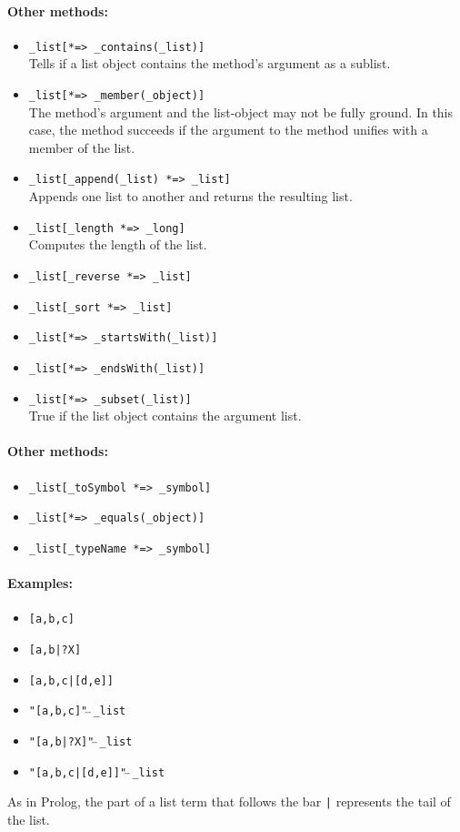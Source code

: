 \documentclass[11pt]{article}
\begin{document}
\paragraph{Other methods:}
\begin{itemize}
\item {\tt \_list[*=> \_contains(\_list)]} 
  \\
  Tells if a list object contains the method's argument as a sublist.
\item {\tt \_list[*=> \_member(\_object)]}  
  \\
  The method's argument and the list-object may not be fully ground. In this
  case, the method succeeds if the argument to the method unifies with a
  member of the list.
\item {\tt \_list[\_append(\_list) *=> \_list]}  \\
  Appends one list to another and returns the resulting list.
\item {\tt \_list[\_length *=> \_long]}  
  \\
  Computes the length of the list.
\item {\tt \_list[\_reverse *=> \_list]}  
\item {\tt \_list[\_sort *=> \_list]}  
\item {\tt \_list[*=> \_startsWith(\_list)]}  
\item {\tt \_list[*=> \_endsWith(\_list)]}  
\item {\tt \_list[*=> \_subset(\_list)]}  
  \\
  True if the list object contains the argument list.
\end{itemize}

\paragraph{Other methods:}
\begin{itemize}
\item {\tt \_list[\_toSymbol *=> \_symbol]}  
\item {\tt \_list[*=> \_equals(\_object)]}  
\item {\tt \_list[\_typeName *=> \_symbol]}  
\end{itemize}

\paragraph{Examples:}
\begin{itemize}
\item {\tt [a,b,c]} 
\item {\tt [a,b|?X]}  
\item {\tt [a,b,c|[d,e]]} 
\item {\tt "[a,b,c]"$\hat{~}\hat{~}$\_list} 
\item {\tt "[a,b|?X]"$\hat{~}\hat{~}$\_list}  
\item {\tt "[a,b,c|[d,e]]"$\hat{~}\hat{~}$\_list} 
\end{itemize}
As in Prolog, the part of a list term that follows the bar \verb,|,
represents the tail of the list.
\end{document}
